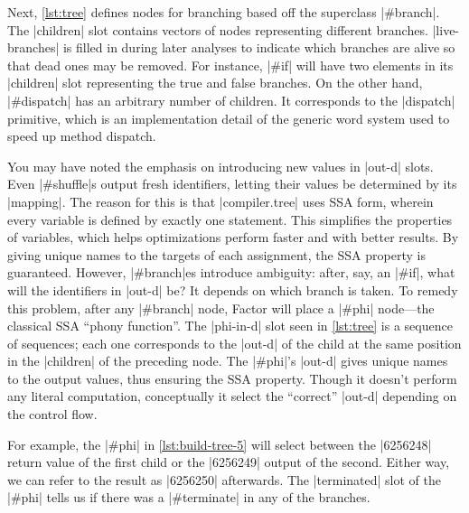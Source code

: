 Next, \vref{lst:tree} defines nodes for branching based off the superclass
\factor|#branch|.  The \factor|children| slot contains vectors of nodes
representing different branches.  \factor|live-branches| is filled in during
later analyses to indicate which branches are alive so that dead ones may be
removed.  For instance, \factor|#if| will have two elements in its
\factor|children| slot representing the true and false branches.  On the other
hand, \factor|#dispatch| has an arbitrary number of children.  It corresponds
to the \factor|dispatch| primitive, which is an implementation detail of the
generic word system used to speed up method dispatch.

You may have noted the emphasis on introducing new values in \factor|out-d|
slots.  Even \factor|#shuffle|s output fresh identifiers, letting their values
be determined by its \factor|mapping|.  The reason for this is that
\factor|compiler.tree| uses \gls{SSA} form, wherein every variable is defined
by exactly one statement.  This simplifies the properties of variables, which
helps optimizations perform faster and with better results.  By giving unique
names to the targets of each assignment, the \gls{SSA} property is guaranteed.
However, \factor|#branch|es introduce ambiguity: after, say, an \factor|#if|,
what will the identifiers in \factor|out-d| be?  It depends on which branch is
taken.  To remedy this problem, after any \factor|#branch| node, Factor will
place a \factor|#phi| node---the classical \gls{SSA} ``phony function''.  The
\factor|phi-in-d| slot seen in \vref{lst:tree} is a sequence of sequences; each
one corresponds to the \factor|out-d| of the child at the same position in the
\factor|children| of the preceding node.  The \factor|#phi|'s \factor|out-d|
gives unique names to the output values, thus ensuring the \gls{SSA} property.
Though it doesn't perform any literal computation, conceptually it select the
``correct'' \factor|out-d| depending on the control flow.


For example, the \factor|#phi| in \vref{lst:build-tree-5} will select between
the
%
\factor|6256248|
%
return value of the first child or the 
%
\factor|6256249|
%
output of the second.  Either way, we can refer to the result as
\factor|6256250| afterwards.  The \factor|terminated| slot of the \factor|#phi|
tells us if there was a \factor|#terminate| in any of the branches.

